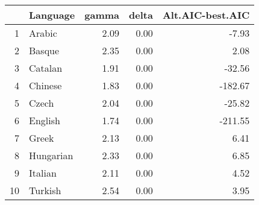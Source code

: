 \begin{table}[ht]
\centering
\begin{tabular}{rlrrr}
  \hline
 & Language & gamma & delta & Alt.AIC-best.AIC \\ 
  \hline
1 & Arabic & 2.09 & 0.00 & -7.93 \\ 
  2 & Basque & 2.35 & 0.00 & 2.08 \\ 
  3 & Catalan & 1.91 & 0.00 & -32.56 \\ 
  4 & Chinese & 1.83 & 0.00 & -182.67 \\ 
  5 & Czech & 2.04 & 0.00 & -25.82 \\ 
  6 & English & 1.74 & 0.00 & -211.55 \\ 
  7 & Greek & 2.13 & 0.00 & 6.41 \\ 
  8 & Hungarian & 2.33 & 0.00 & 6.85 \\ 
  9 & Italian & 2.11 & 0.00 & 4.52 \\ 
  10 & Turkish & 2.54 & 0.00 & 3.95 \\ 
   \hline
\end{tabular}
\end{table}
